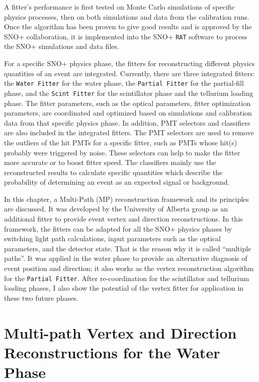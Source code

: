A fitter's performance is first tested on Monte Carlo simulations of specific physics processes, then on both simulations and data from the calibration runs. Once the algorithm has been proven to give good results and is approved by the SNO+ collaboration, it is implemented into the SNO+ \texttt{RAT} software to process the SNO+ simulations and data files.

For a specific SNO+ physics phase, the fitters for reconstructing different physics quantities of an event are integrated. Currently, there are three integrated fitters: the \texttt{Water Fitter} for the water phase, the \texttt{Partial Fitter} for the partial-fill phase, and the \texttt{Scint Fitter} for the scintillator phase and the tellurium loading phase. The fitter parameters, such as the optical parameters, fitter optimization parameters, are coordinated and optimized based on simulations and calibration data from that specific physics phase. In addition, PMT selectors and classifiers are also included in the integrated fitters. The PMT selectors are used to remove the outliers of the hit PMTs for a specific fitter, such as PMTs whose hit(s) probably were triggered by noise. These selectors can help to make the fitter more accurate or to boost fitter speed. The classifiers mainly use the reconstructed results to calculate specific quantities which describe the probability of determining an event as an expected signal or background.

In this chapter, a Multi-Path (MP) reconstruction framework and its principles are discussed. It was developed by the University of Alberta group as an additional fitter to provide event vertex and direction reconstructions. In this framework, the fitters can be adapted for all the SNO+ physics phases by switching light path calculations, input parameters such as the optical parameters, and the detector state. That is the reason why it is called ``multiple paths''.  It was applied in the water phase to provide an alternative diagnosis of event position and direction; it also works as the vertex reconstruction algorithm for the \texttt{Partial Fitter}. After re-coordination for the scintillator and tellurium loading phases, I also show the potential of the vertex fitter for application in these two future phases.
\section{Multi-path Vertex and Direction Reconstructions for the Water Phase}\label{sect:mpw}

